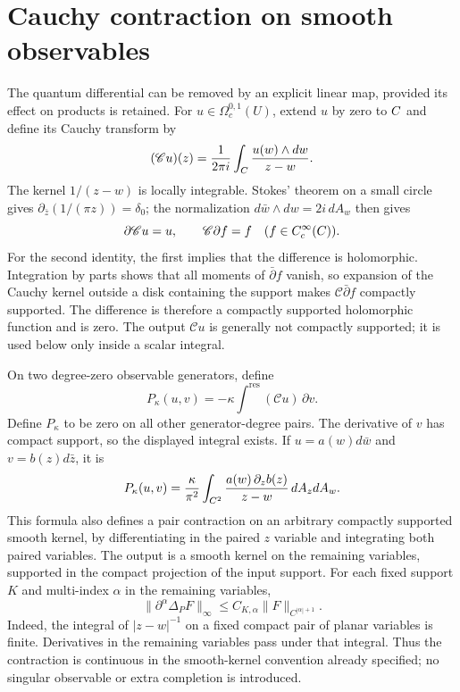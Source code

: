 \section{Cauchy contraction on smooth observables}

The quantum differential can be removed by an explicit linear map,
provided its effect on products is retained.  For
$u\in\Omega_c^{0,1}(U)$, extend $u$ by zero to $C$ and define its
Cauchy transform by
\[
 (\mathscr C u)(z)=\frac1{2\pi i}\int_{C}
                       \frac{u(w)\wedge dw}{z-w}.
\]
The kernel $1/(z-w)$ is locally integrable.  Stokes' theorem on a
small circle gives
$\partial_{\bar z}(1/(\pi z))=\delta_0$; the normalization
$d\bar w\wedge dw=2i\,dA_w$ then gives
\[
 \partial\mathscr C u=u,\qquad
 \mathscr C\partial f=f\quad(f\in C_c^\infty(C)).
\]
For the second identity, the first implies that the difference is
holomorphic.  Integration by parts shows that all moments of
$\bar\partial f$ vanish, so expansion of the Cauchy kernel outside
a disk containing the support makes $\mathscr C\bar\partial f$ compactly supported.
The difference is therefore a compactly supported holomorphic
function and is zero.  The output $\mathscr C u$ is generally not
compactly supported; it is used below only inside a scalar integral.

On two degree-zero observable generators, define
\[
 P_\kappa(u,v)=-\kappa\int^{\mathrm{res}}
                             (\mathscr C u)\,\partial v.
\]
Define $P_\kappa$ to be zero on all other generator-degree pairs.
The derivative of $v$ has compact support, so the displayed integral
exists.  If $u=a(w)d\bar w$ and $v=b(z)d\bar z$, it is
\[
 P_\kappa(u,v)=\frac{\kappa}{\pi^2}
     \int_{C^2}\frac{a(w)\,\partial_z b(z)}{z-w}\,dA_zdA_w.
\]
This formula also defines a pair contraction on an arbitrary compactly
supported smooth kernel, by differentiating in the paired $z$
variable and integrating both paired variables.  The output is a
smooth kernel on the remaining variables, supported in the compact
projection of the input support.  For each fixed support $K$ and
multi-index $\alpha$ in the remaining variables,
\[
 \|\partial^\alpha\Delta_P F\|_\infty
       \le C_{K,\alpha}\|F\|_{C^{|\alpha|+1}}.
\]
Indeed, the integral of $|z-w|^{-1}$ on a fixed compact pair of planar
variables is finite.  Derivatives in the remaining variables pass
under that integral.  Thus the contraction is continuous in the
smooth-kernel convention already specified; no singular observable
or extra completion is introduced.


